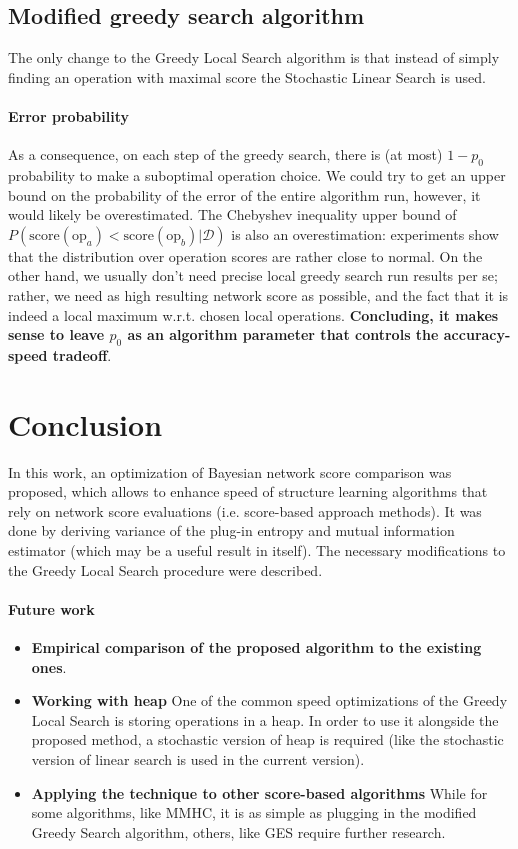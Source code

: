 \documentclass{article}
\newcommand{\score}[1]{\textrm{score}(#1)}
\begin{document}
\subsection{Modified greedy search algorithm}
The only change to the Greedy Local Search algorithm is that instead of simply finding an operation with maximal score the Stochastic Linear Search is used. 

\paragraph{Error probability} As a consequence, on each step of the greedy search, there is (at most) $1 - p_0$ probability to make a suboptimal operation choice. We could try to get an upper bound on the probability of the error of the entire algorithm run, however, it would likely be overestimated. The Chebyshev inequality upper bound of $P(\score{\textrm{op}_a} < \score{\textrm{op}_b} | \mathcal{D})$ is also an overestimation: experiments show that the distribution over operation scores are rather close to normal. On the other hand, we usually don't need precise local greedy search run results per se; rather, we need as high resulting network score as possible, and the fact that it is indeed a local maximum w.r.t. chosen local operations. \textbf{Concluding, it makes sense to leave $p_0$ as an algorithm parameter that controls the accuracy-speed tradeoff}.

\section{Conclusion}
In this work, an optimization of Bayesian network score comparison was proposed, which allows to enhance speed of structure learning algorithms that rely on network score evaluations (i.e. score-based approach methods). It was done by deriving variance of the plug-in entropy and mutual information estimator (which may be a useful result in itself). The necessary modifications to the Greedy Local Search procedure were described. 

\paragraph{Future work}
\begin{itemize}
	\item \textbf{Empirical comparison of the proposed algorithm to the existing ones}.
	\item \textbf{Working with heap} One of the common speed optimizations of the Greedy Local Search is storing operations in a heap. In order to use it alongside the proposed method, a stochastic version of heap is required (like the stochastic version of linear search is used in the current version).
	\item \textbf{Applying the technique to other score-based algorithms} While for some algorithms, like MMHC, it is as simple as plugging in the modified Greedy Search algorithm, others, like GES require further research. 
	\end{itemize}
\end{document}
